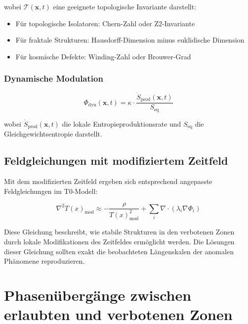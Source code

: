 \documentclass[12pt,a4paper]{article}
\newcommand{\Tfield}{T(x)}
\begin{document}
	wobei $\mathcal{T}(\mathbf{x}, t)$ eine geeignete topologische Invariante darstellt:
	
	\begin{itemize}
		\item Für topologische Isolatoren: Chern-Zahl oder Z2-Invariante
		\item Für fraktale Strukturen: Hausdorff-Dimension minus euklidische Dimension
		\item Für kosmische Defekte: Winding-Zahl oder Brouwer-Grad
	\end{itemize}
	
	\subsubsection{Dynamische Modulation}
	\label{subsubsec:dyn_modulation}
	
	\begin{equation}
		\Phi_{\text{dyn}}(\mathbf{x}, t) = \kappa \cdot \frac{\dot{S}_{\text{prod}}(\mathbf{x}, t)}{S_{\text{eq}}}
	\end{equation}
	
	wobei $\dot{S}_{\text{prod}}(\mathbf{x}, t)$ die lokale Entropieproduktionsrate und $S_{\text{eq}}$ die Gleichgewichtsentropie darstellt.
	
	\subsection{Feldgleichungen mit modifiziertem Zeitfeld}
	\label{subsec:feldgleichungen}
	
	Mit dem modifizierten Zeitfeld ergeben sich entsprechend angepasste Feldgleichungen im T0-Modell:
	
	\begin{equation}
		\nabla^2\Tfield_{\text{mod}} \approx -\frac{\rho}{\Tfield_{\text{mod}}^2} + \sum_i \nabla \cdot \left( \lambda_i \nabla \Phi_i \right)
	\end{equation}
	
	Diese Gleichung beschreibt, wie stabile Strukturen in den verbotenen Zonen durch lokale Modifikationen des Zeitfeldes ermöglicht werden. Die Lösungen dieser Gleichung sollten exakt die beobachteten Längen\-skalen der anomalen Phänomene reproduzieren.
	
	\section{Phasenübergänge zwischen erlaubten und verbotenen Zonen}
	\label{sec:phasenuebergaenge}
	
\end{document}
